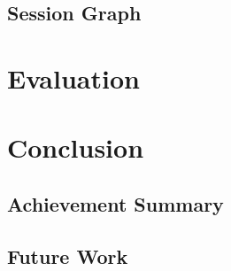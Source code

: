 \documentclass[11pt]{scrartcl}
\begin{document}

\subsection{Session Graph}





\section{Evaluation}




\section{Conclusion}

\subsection{Achievement Summary}

\subsection{Future Work}


\end{document}
